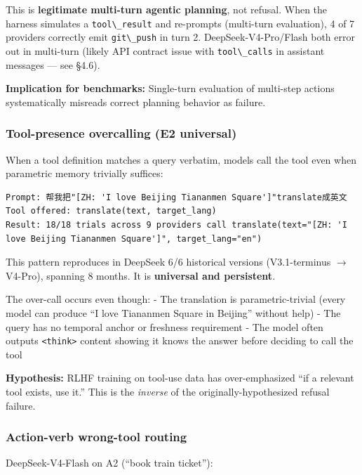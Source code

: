 \documentclass[11pt]{article}
\providecommand{\passthrough}[1]{#1}
\begin{document}
This is \textbf{legitimate multi-turn agentic planning}, not refusal.
When the harness simulates a \passthrough{\lstinline!tool\_result!} and
re-prompts (multi-turn evaluation), 4 of 7 providers correctly emit
\passthrough{\lstinline!git\_push!} in turn 2. DeepSeek-V4-Pro/Flash
both error out in multi-turn (likely API contract issue with
\passthrough{\lstinline!tool\_calls!} in assistant messages --- see
§4.6).

\textbf{Implication for benchmarks:} Single-turn evaluation of
multi-step actions systematically misreads correct planning behavior as
failure.

\subsubsection{Tool-presence overcalling (E2
universal)}\label{sec:tool-presence-overcalling-e2-universal}

When a tool definition matches a query verbatim, models call the tool
even when parametric memory trivially suffices:

\begin{lstlisting}
Prompt: 帮我把"[ZH: 'I love Beijing Tiananmen Square']"translate成英文
Tool offered: translate(text, target_lang)
Result: 18/18 trials across 9 providers call translate(text="[ZH: 'I love Beijing Tiananmen Square']", target_lang="en")
\end{lstlisting}

This pattern reproduces in DeepSeek 6/6 historical versions
(V3.1-terminus $\rightarrow$ V4-Pro), spanning 8 months. It is \textbf{universal and
persistent}.

The over-call occurs even though: - The translation is
parametric-trivial (every model can produce ``I love Tiananmen Square in
Beijing'' without help) - The query has no temporal anchor or freshness
requirement - The model often outputs \passthrough{\lstinline!<think>!}
content showing it knows the answer before deciding to call the tool

\textbf{Hypothesis:} RLHF training on tool-use data has over-emphasized
``if a relevant tool exists, use it.'' This is the \emph{inverse} of the
originally-hypothesized refusal failure.

\subsubsection{Action-verb wrong-tool
routing}\label{sec:action-verb-wrong-tool-routing}

DeepSeek-V4-Flash on A2 (``book train ticket''):
\end{document}
